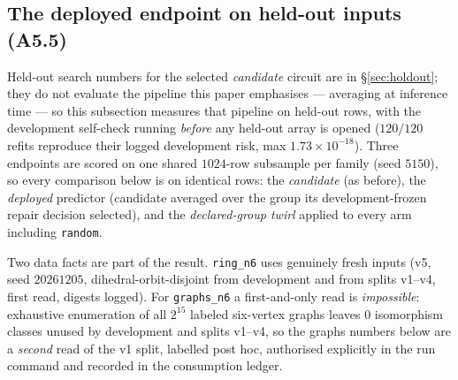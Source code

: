 \documentclass{neurips_2024}
\begin{document}
\subsection{The deployed endpoint on held-out inputs (A5.5)}
\label{sec:deployed}

Held-out search numbers for the selected \emph{candidate} circuit are in \S\ref{sec:holdout};
they do not evaluate the pipeline this paper emphasises --- averaging at inference time --- so
this subsection measures that pipeline on held-out rows, with the development self-check running
\emph{before} any held-out array is opened ($120/120$ refits reproduce their logged
development risk, max $1.73\times10^{-18}$). Three endpoints are scored on one shared
$1024$-row subsample per family (seed $5150$), so every comparison below is on identical rows:
the \emph{candidate} (as before), the \emph{deployed} predictor (candidate averaged over the
group its development-frozen repair decision selected), and the \emph{declared-group twirl}
applied to every arm including \texttt{random}.

Two data facts are part of the result. \texttt{ring\_n6} uses genuinely fresh inputs
(v5, seed $20261205$, dihedral-orbit-disjoint from development and from splits v1--v4, first
read, digests logged). For \texttt{graphs\_n6} a first-and-only read is \emph{impossible}:
exhaustive enumeration of all $2^{15}$ labeled six-vertex graphs leaves $0$ isomorphism
classes unused by development and splits v1--v4, so the graphs numbers below are a
\emph{second} read of the v1 split, labelled post hoc, authorised explicitly in the run
command and recorded in the consumption ledger.
\end{document}
